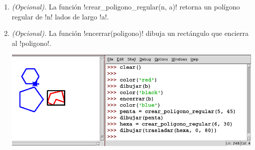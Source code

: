 \documentclass[12pt,spanish]{article}
\begin{document}
\begin{enumerate}[leftmargin=0pt]
    \item
      \emph{(Opcional).}
      La función \li!crear_poligono_regular(n, a)!
      retorna un polígono regular de \li!n! lados
      de largo \li!a!.

    \item
      \emph{(Opcional).}
      La función \li!encerrar(poligono)!
      dibuja un rectángulo que encierra al \li!poligono!.

      \includegraphics[width=\textwidth]{p3}

  \end{enumerate}
\end{document}
